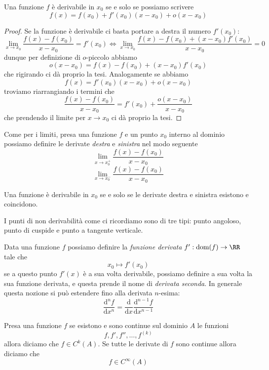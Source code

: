 \documentclass[11pt]{scrartcl}
\newcommand{\dif}{\text{d}}
\begin{document}
	\begin{proposition}
		Una funzione $f$ è derivabile in $x_0$ se e solo se possiamo scrivere
		$$f(x)=f(x_0)+f'(x_0)(x-x_0)+o(x-x_0)$$
	\end{proposition}
	\begin{proof}
		Se la funzione è derivabile ci basta portare a destra il numero $f'(x_0)$:
		$$\lim_{x\to x_0}\frac{f(x)-f(x_0)}{x-x_0}=f'(x_0) \iff \lim_{x\to x_0}\frac{f(x)-f(x_0)+(x-x_0)f'(x_0)}{x-x_0}=0$$
		dunque per definizione di $o$-piccolo abbiamo
		$$o(x-x_0)=f(x)-f(x_0)+(x-x_0)f'(x_0)$$
		che rigirando ci dà proprio la tesi. Analogamente se abbiamo
		$$f(x)=f'(x_0)(x-x_0)+o(x-x_0)$$
		troviamo riarrangiando i termini che 
		$$\frac{f(x)-f(x_0)}{x-x_0}=f'(x_0)+\frac{o(x-x_0)}{x-x_0}$$
		che prendendo il limite per $x\to x_0$ ci dà proprio la tesi.
	\end{proof}
	\begin{definition}
		Come per i limiti, presa una funzione $f$ e un punto $x_0$ interno al dominio possiamo definire le derivate \textit{destra} e \textit{sinistra} nel modo seguente
		$$\lim_{x\to x_0^+}\frac{f(x)-f(x_0)}{x-x_0}$$
		$$\lim_{x\to x_0^-}\frac{f(x)-f(x_0)}{x-x_0}$$
	\end{definition}
	\begin{proposition}[destra + sinistra = convergenza]
		Una funzione è derivabile in $x_0$ se e solo se le derivate destra e sinistra esistono e coincidono.
	\end{proposition}
	I punti di non derivabilità come ci ricordiamo sono di tre tipi: punto angoloso, punto di cuspide e punto a tangente verticale.
	\begin{definition}
		Data una funzione $f$ possiamo definire la \textit{funzione derivata} $f':\text{dom}(f)\to\RR$ tale che
		$$x_0\mapsto f'(x_0)$$
		se a questo punto $f'(x)$ è a sua volta derivabile, possiamo definire a sua volta la sua funzione derivata, e questa prende il nome di \textit{derivata seconda}. In generale questa nozione si può estendere fino alla derivata $n$-esima:
		$$\frac{\dif^nf}{\dif x^n}=\frac{\dif }{\dif x}\frac{\dif^{n-1}f}{\dif x^{n-1}}$$
	\end{definition}
	\begin{definition}
		Presa una funzione $f$ se esistono e sono continue sul dominio $A$ le funzioni
		$$f,f',f'',\dots,f^{(k)}$$
		allora diciamo che $f\in C^k(A)$. Se tutte le derivate di $f$ sono continue allora diciamo che 
		$$f\in C^\infty(A)$$ 
	\end{definition}
	
\end{document}
